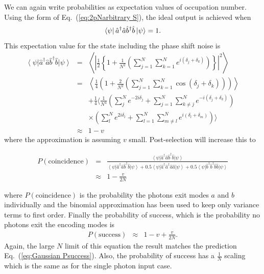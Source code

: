 \documentclass[aps,pra,twocolumn,superscriptaddress,numerical,floatfix]{revtex4-1}
\begin{document}
We can again write probabilities as expectation values of occupation number.  Using the form of Eq.~(\ref{eq:2pNarbitrary S}), the ideal output is achieved when
\begin{equation}
\bra{\psi}\hat{a}^{\dagger}\hat{a}\hat{b}^{\dagger}\hat{b}\ket{\psi} = 1.
\end{equation}
This expectation value for the state including the phase shift noise is
\begin{eqnarray}
\left\langle \psi\right|\hat{a}^{\dagger}\hat{a}\hat{b}^{\dagger}\hat{b}\left|\psi\right\rangle & = & \left\langle \left|\frac{1}{2}\left\{ 1+\frac{1}{N^{2}}\left(\sum_{j=1}^{N}\sum_{k=1}^{N}e^{i(\delta_{j}+\delta_{k})}\right)\right\} \right|^{2}\right\rangle \nonumber \\
& = & \left\langle \frac{1}{4}\left(1+\frac{2}{N^{2}}\left(\sum_{j=1}^{N}\sum_{k=1}^{N}\cos\left(\delta_{j}+\delta_{k}\right)\right)\right)\right\rangle \nonumber \\
&  & +\frac{1}{4}\Biggl\langle\frac{1}{N^{4}}\left(\sum_{j}^{N}e^{-2i\delta_{j}}+\sum_{j=1}^{N}\sum_{k\ne j}^{N}e^{-i(\delta_{j}+\delta_{k})}\right)\nonumber \\
&  & \times\left(\sum_{l}^{N}e^{2i\delta_{l}}+\sum_{l=1}^{N}\sum_{m\ne l}^{N}e^{i(\delta_{l}+\delta_{m})}\right)\Biggr\rangle\nonumber \\
& \approx & 1-v\label{eq:exp. value aabb}
\end{eqnarray}
where the approximation is assuming $v$ small.  Post-selection will increase this to 
\begin{widetext}
\begin{eqnarray}
P(\textrm{coincidence}) & = & \frac{\left\langle \psi\right|\hat{a}^{\dagger}\hat{a}\hat{b}^{\dagger}\hat{b}\left|\psi\right\rangle }{\left\langle \psi\right|\hat{a}^{\dagger}\hat{a}\hat{b}^{\dagger}\hat{b}\left|\psi\right\rangle +0.5\left\langle \psi\right|\hat{a}^{\dagger}\hat{a}^{\dagger}\hat{a}\hat{a}\left|\psi\right\rangle +0.5\left\langle \psi\right|\hat{b}^{\dagger}\hat{b}^{\dagger}\hat{b}\hat{b}\left|\psi\right\rangle }\nonumber \\
& \approx & 1-\frac{v}{2N}\label{eq:2pNarb PS}
\end{eqnarray}
\end{widetext}
where $P(\textrm{coincidence})$ is the probability the photons exit modes $a$ and $b$ individually and the binomial approximation has been used to keep only variance terms to first order.  Finally the probability of success, which is the probability no photons exit the encoding modes is 
\begin{eqnarray}
	P(\textrm{success}) & \approx & 1-v+\frac{v}{2N}.\label{eq:2pNarb Success}
\end{eqnarray}
Again, the large $N$ limit of this equation the result matches the prediction Eq.~(\ref{eq:Gaussian Psuccess}). Also, the probability of success has a $\frac{1}{N}$ scaling which is the same as for the single photon input case. 
\end{document}

